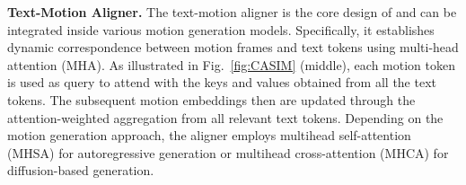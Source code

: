 \textbf{Text-Motion Aligner.} The text-motion aligner is the core design of {\modulename} and can be integrated inside various motion generation models.
Specifically, it establishes dynamic correspondence between motion frames and text tokens using multi-head attention (MHA). 
As illustrated in Fig.~\ref{fig:CASIM} (middle), each motion token is used as query to attend with the keys and values obtained from all the text tokens. 
The subsequent motion embeddings then are updated through the attention-weighted aggregation from all relevant text tokens. 
Depending on the motion generation approach, the aligner employs multihead self-attention (MHSA) for autoregressive generation or multihead cross-attention (MHCA) for diffusion-based generation. 




\vspace{-3pt}
